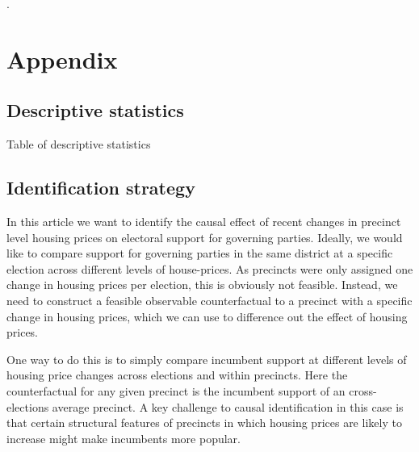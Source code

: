 \documentclass[12pt,a4paper]{article}
\begin{document}
	
	
	
	
	
	.
	
	
	
	
	
	\clearpage
	
	\singlespacing
	
	
	
	
	\newpage
	
	\appendix
	\section*{Appendix}
	\renewcommand{\thesubsection}{\Alph{subsection}}
	\renewcommand{\thetable}{\Alph{subsection}\arabic{table}}
	
	\localtableofcontents
	
	\subsection{Descriptive statistics}
	\setcounter{table}{0}
	
	Table of descriptive statistics
	
	\newpage
	
	\subsection{Identification strategy}
	
	In this article we want to identify the causal effect of recent changes in precinct level housing prices on electoral support for governing parties. Ideally, we would like to compare support for governing parties in the same district at a specific election across different levels of house-prices. As precincts were only assigned one change in housing prices per election, this is obviously not feasible. Instead, we need to construct a feasible observable counterfactual to a precinct with a specific change in housing prices, which we can use to difference out the effect of housing prices.
	
	One way to do this is to simply compare incumbent support at different levels of housing price changes across elections and within precincts. Here the counterfactual for any given precinct is the incumbent support of an cross-elections average precinct. A key challenge to causal identification in this case is that certain structural features of precincts in which housing prices are likely to increase might make incumbents more popular.
	
\end{document}
